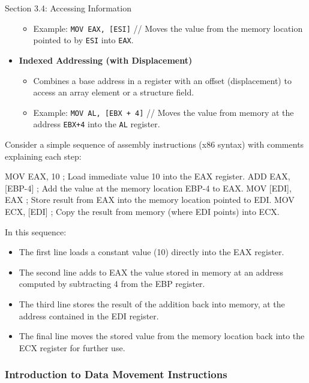 \begin{notes}{Section 3.4: Accessing Information}
\begin{itemize}
\begin{itemize}
            \item Example: \texttt{MOV EAX, [ESI]} // Moves the value from the memory location pointed to by \texttt{ESI} into \texttt{EAX}.
        \end{itemize}
        \item \textbf{Indexed Addressing (with Displacement)}
        \begin{itemize}
            \item Combines a base address in a register with an offset (displacement) to access an array element or a structure field.
            \item Example: \texttt{MOV AL, [EBX + 4]} // Moves the value from memory at the address \texttt{EBX+4} into the \texttt{AL} register.
        \end{itemize}
    \end{itemize}

    \begin{highlight}
        Consider a simple sequence of assembly instructions (x86 syntax) with comments explaining each step:

    \begin{code}[Assembly]
    MOV EAX, 10       ; Load immediate value 10 into the EAX register.
    ADD EAX, [EBP-4]  ; Add the value at the memory location EBP-4 to EAX.
    MOV [EDI], EAX    ; Store result from EAX into the memory location pointed to EDI.
    MOV ECX, [EDI]    ; Copy the result from memory (where EDI points) into ECX.            
    \end{code}
        In this sequence:

        \begin{itemize}
            \item The first line loads a constant value (10) directly into the EAX register.
            \item The second line adds to EAX the value stored in memory at an address computed by subtracting 4 from the EBP register.
            \item The third line stores the result of the addition back into memory, at the address contained in the EDI register.
            \item The final line moves the stored value from the memory location back into the ECX register for further use.
        \end{itemize}
    \end{highlight}

    \subsubsection*{Introduction to Data Movement Instructions}


\end{notes}
